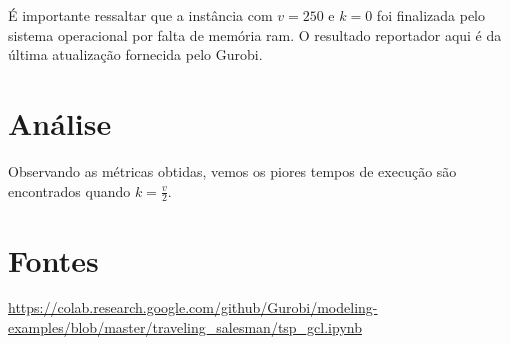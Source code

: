 \documentclass[11pt]{article}
\theoremstyle{definition}
\theoremstyle{definition}
\theoremstyle{remark}
\theoremstyle{remark}
\theoremstyle{remark}
\theoremstyle{remark}
\theoremstyle{definition}
\begin{document}
É importante ressaltar que a instância com \(v=250\) e \(k=0\) foi finalizada pelo sistema operacional por falta de memória ram. O resultado reportador aqui é da última atualização fornecida pelo Gurobi.

\section{Análise}
\label{sec:org28fc642}
Observando as métricas obtidas, vemos os piores tempos de execução são encontrados quando \(k = \frac{v}{2}\).
\section{Fontes}
\label{sec:orge1b2eb8}
\url{https://colab.research.google.com/github/Gurobi/modeling-examples/blob/master/traveling\_salesman/tsp\_gcl.ipynb}
\end{document}
